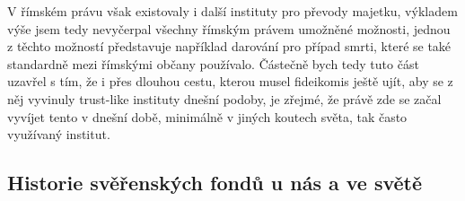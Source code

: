 \documentclass{article}
\begin{document}
V římském právu však existovaly i další instituty pro převody majetku, výkladem výše jsem tedy nevyčerpal všechny římským právem umožněné mož\-nosti, jednou z těchto možností představuje například darování pro případ smrti, které se také standardně mezi římskými občany používalo. Částečně bych tedy tuto část uzavřel s tím, že i přes dlouhou cestu, kterou musel fideikomis ještě ujít, aby se z něj vyvinuly trust-like instituty dnešní podoby, je zřejmé, že právě zde se začal vyvíjet tento v dnešní době, minimálně v jiných koutech světa, tak často využívaný institut.\\






\newpage

\subsection{Historie svěřenských fondů u nás a ve světě}
\end{document}
